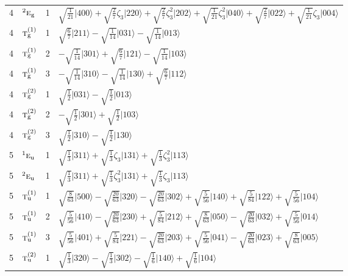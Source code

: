 \documentclass[11pt]{article}
\newcommand{\irr}[1]{\text{\normalfont\scshape #1}}
\newcommand{\conjpair}[1]{{}^{#1}}
\newcommand{\ptag}[1]{\mathrm{#1}}
\newcommand{\rootunity}[1]{\zeta_{#1}}
\newcommand{\occ}[1]{\lvert #1\rangle}
\begin{document}
\begin{longtable}{c l c p{}}
4 & $\conjpair{2}\irr{e}_{\ptag{g}}$ & 1 & $\sqrt{\tfrac{1}{21}}\occ{400}+\sqrt{\tfrac{2}{7}}\rootunity{3}\occ{220}+\sqrt{\tfrac{2}{7}}\rootunity{3}^{2}\occ{202}+\sqrt{\tfrac{1}{21}}\rootunity{3}^{2}\occ{040}+\sqrt{\tfrac{2}{7}}\occ{022}+\sqrt{\tfrac{1}{21}}\rootunity{3}\occ{004}$\\
4 & $\irr{t}_{\ptag{g}}^{(1)}$ & 1 & $\sqrt{\tfrac{6}{7}}\occ{211}-\sqrt{\tfrac{1}{14}}\occ{031}-\sqrt{\tfrac{1}{14}}\occ{013}$\\
4 & $\irr{t}_{\ptag{g}}^{(1)}$ & 2 & $-\sqrt{\tfrac{1}{14}}\occ{301}+\sqrt{\tfrac{6}{7}}\occ{121}-\sqrt{\tfrac{1}{14}}\occ{103}$\\
4 & $\irr{t}_{\ptag{g}}^{(1)}$ & 3 & $-\sqrt{\tfrac{1}{14}}\occ{310}-\sqrt{\tfrac{1}{14}}\occ{130}+\sqrt{\tfrac{6}{7}}\occ{112}$\\
4 & $\irr{t}_{\ptag{g}}^{(2)}$ & 1 & $\sqrt{\tfrac{1}{2}}\occ{031}-\sqrt{\tfrac{1}{2}}\occ{013}$\\
4 & $\irr{t}_{\ptag{g}}^{(2)}$ & 2 & $-\sqrt{\tfrac{1}{2}}\occ{301}+\sqrt{\tfrac{1}{2}}\occ{103}$\\
4 & $\irr{t}_{\ptag{g}}^{(2)}$ & 3 & $\sqrt{\tfrac{1}{2}}\occ{310}-\sqrt{\tfrac{1}{2}}\occ{130}$\\
\hline
5 & $\conjpair{1}\irr{e}_{\ptag{u}}$ & 1 & $\sqrt{\tfrac{1}{3}}\occ{311}+\sqrt{\tfrac{1}{3}}\rootunity{3}\occ{131}+\sqrt{\tfrac{1}{3}}\rootunity{3}^{2}\occ{113}$\\
5 & $\conjpair{2}\irr{e}_{\ptag{u}}$ & 1 & $\sqrt{\tfrac{1}{3}}\occ{311}+\sqrt{\tfrac{1}{3}}\rootunity{3}^{2}\occ{131}+\sqrt{\tfrac{1}{3}}\rootunity{3}\occ{113}$\\
5 & $\irr{t}_{\ptag{u}}^{(1)}$ & 1 & $\sqrt{\tfrac{8}{63}}\occ{500}-\sqrt{\tfrac{20}{63}}\occ{320}-\sqrt{\tfrac{20}{63}}\occ{302}+\sqrt{\tfrac{5}{56}}\occ{140}+\sqrt{\tfrac{5}{84}}\occ{122}+\sqrt{\tfrac{5}{56}}\occ{104}$\\
5 & $\irr{t}_{\ptag{u}}^{(1)}$ & 2 & $\sqrt{\tfrac{5}{56}}\occ{410}-\sqrt{\tfrac{20}{63}}\occ{230}+\sqrt{\tfrac{5}{84}}\occ{212}+\sqrt{\tfrac{8}{63}}\occ{050}-\sqrt{\tfrac{20}{63}}\occ{032}+\sqrt{\tfrac{5}{56}}\occ{014}$\\
5 & $\irr{t}_{\ptag{u}}^{(1)}$ & 3 & $\sqrt{\tfrac{5}{56}}\occ{401}+\sqrt{\tfrac{5}{84}}\occ{221}-\sqrt{\tfrac{20}{63}}\occ{203}+\sqrt{\tfrac{5}{56}}\occ{041}-\sqrt{\tfrac{20}{63}}\occ{023}+\sqrt{\tfrac{8}{63}}\occ{005}$\\
5 & $\irr{t}_{\ptag{u}}^{(2)}$ & 1 & $\sqrt{\tfrac{1}{3}}\occ{320}-\sqrt{\tfrac{1}{3}}\occ{302}-\sqrt{\tfrac{1}{6}}\occ{140}+\sqrt{\tfrac{1}{6}}\occ{104}$\\

\end{longtable}
\end{document}
